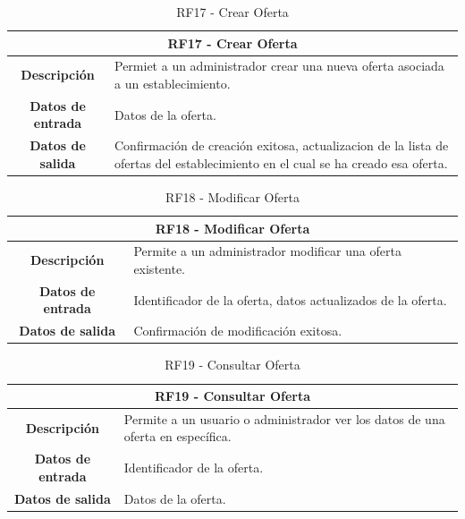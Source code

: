 \begin{table}[H]
    \centering
    \begin{tabular}{|c|p{10cm}|}
        \hline
        \multicolumn{2}{|c|}{\textbf{RF17 - Crear Oferta}}                                                                                                         \\
        \hline
        \textbf{Descripción}      & Permiet a un administrador crear una nueva oferta asociada a un establecimiento.                                               \\
        \hline
        \textbf{Datos de entrada} & Datos de la oferta.                                                                                                            \\
        \hline
        \textbf{Datos de salida}  & Confirmación de creación exitosa, actualizacion de la lista de ofertas del establecimiento en el cual se ha creado esa oferta. \\
        \hline
    \end{tabular}
    \caption{RF17 - Crear Oferta}
\end{table}

\begin{table}[H]
    \centering
    \begin{tabular}{|c|p{10cm}|}
        \hline
        \multicolumn{2}{|c|}{\textbf{RF18 - Modificar Oferta}}                                   \\
        \hline
        \textbf{Descripción}      & Permite a un administrador modificar una oferta existente.   \\
        \hline
        \textbf{Datos de entrada} & Identificador de la oferta, datos actualizados de la oferta. \\
        \hline
        \textbf{Datos de salida}  & Confirmación de modificación exitosa.                        \\
        \hline
    \end{tabular}
    \caption{RF18 - Modificar Oferta}
\end{table}

\begin{table}[H]
    \centering
    \begin{tabular}{|c|p{10cm}|}
        \hline
        \multicolumn{2}{|c|}{\textbf{RF19 - Consultar Oferta}}                                                      \\
        \hline
        \textbf{Descripción}      & Permite a un usuario o administrador ver los datos de una oferta en específica. \\
        \hline
        \textbf{Datos de entrada} & Identificador de la oferta.                                                     \\
        \hline
        \textbf{Datos de salida}  & Datos de la oferta.                                                             \\
        \hline
    \end{tabular}
    \caption{RF19 - Consultar Oferta}
\end{table}

